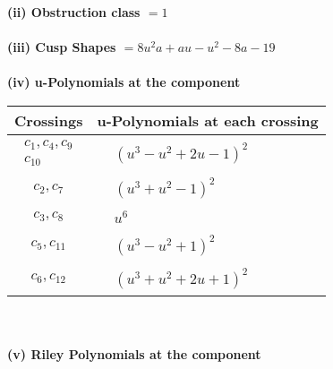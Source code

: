 \documentclass[1p]{elsarticle_modified}
\theoremstyle{definition}
\begin{document}
\flushleft \textbf{(ii) Obstruction class $= 1$}\\~\\
\flushleft \textbf{(iii) Cusp Shapes $= 8 u^2 a+a u- u^2-8 a-19$}\\~\\
\newpage\renewcommand{\arraystretch}{1}
\flushleft \textbf{(iv) u-Polynomials at the component}\newline \\
\begin{tabular}{m{50pt}|m{274pt}}
Crossings & \hspace{64pt}u-Polynomials at each crossing \\
\hline $$\begin{aligned}c_{1},c_{4},c_{9}\\c_{10}\end{aligned}$$&$\begin{aligned}
&(u^3- u^2+2 u-1)^2
\end{aligned}$\\
\hline $$\begin{aligned}c_{2},c_{7}\end{aligned}$$&$\begin{aligned}
&(u^3+u^2-1)^2
\end{aligned}$\\
\hline $$\begin{aligned}c_{3},c_{8}\end{aligned}$$&$\begin{aligned}
&u^6
\end{aligned}$\\
\hline $$\begin{aligned}c_{5},c_{11}\end{aligned}$$&$\begin{aligned}
&(u^3- u^2+1)^2
\end{aligned}$\\
\hline $$\begin{aligned}c_{6},c_{12}\end{aligned}$$&$\begin{aligned}
&(u^3+u^2+2 u+1)^2
\end{aligned}$\\
\hline
\end{tabular}\\~\\
\newpage\renewcommand{\arraystretch}{1}
\flushleft \textbf{(v) Riley Polynomials at the component}\newline \\
\end{document}
